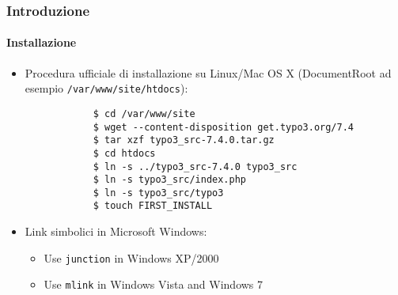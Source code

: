 \begin{frame}[fragile]
	\frametitle{Introduzione}
	\framesubtitle{Installazione}

	\begin{itemize}
		\item Procedura ufficiale di installazione su Linux/Mac OS X\newline
			(DocumentRoot ad esempio \texttt{/var/www/site/htdocs}):
		\begin{lstlisting}
			$ cd /var/www/site
			$ wget --content-disposition get.typo3.org/7.4
			$ tar xzf typo3_src-7.4.0.tar.gz
			$ cd htdocs
			$ ln -s ../typo3_src-7.4.0 typo3_src
			$ ln -s typo3_src/index.php
			$ ln -s typo3_src/typo3
			$ touch FIRST_INSTALL
		\end{lstlisting}

		\item Link simbolici in Microsoft Windows:

			\begin{itemize}
				\item Use \texttt{junction} in Windows XP/2000
				\item Use \texttt{mlink} in Windows Vista and Windows 7
			\end{itemize}

	\end{itemize}
\end{frame}

